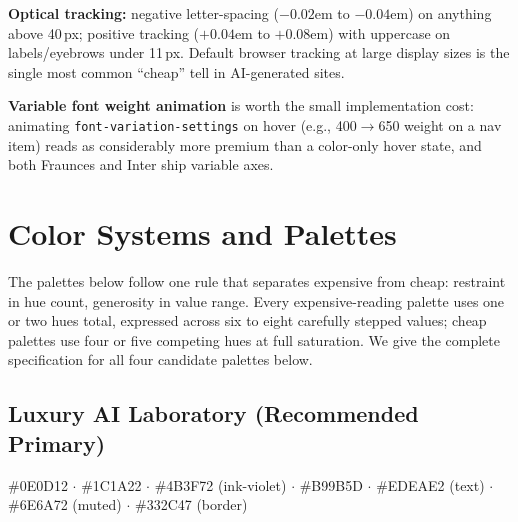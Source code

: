 \documentclass[conference]{IEEEtran}
\begin{document}
\textbf{Optical tracking:} negative letter-spacing ($-0.02$em to $-0.04$em) on anything above 40\,px; positive tracking ($+0.04$em to $+0.08$em) with uppercase on labels/eyebrows under 11\,px. Default browser tracking at large display sizes is the single most common ``cheap'' tell in AI-generated sites.

\textbf{Variable font weight animation} is worth the small implementation cost: animating \texttt{font-variation-settings} on hover (e.g., 400$\to$650 weight on a nav item) reads as considerably more premium than a color-only hover state, and both Fraunces and Inter ship variable axes.

\section{Color Systems and Palettes}

The palettes below follow one rule that separates expensive from cheap: restraint in hue count, generosity in value range. Every expensive-reading palette uses one or two hues total, expressed across six to eight carefully stepped values; cheap palettes use four or five competing hues at full saturation. We give the complete specification for all four candidate palettes below.

\subsection{Luxury AI Laboratory (Recommended Primary)}
\noindent
{}
\par\noindent\footnotesize \#0E0D12 $\cdot$ \#1C1A22 $\cdot$ \#4B3F72 (ink-violet) $\cdot$ \#B99B5D $\cdot$ \#EDEAE2 (text) $\cdot$ \#6E6A72 (muted) $\cdot$ \#332C47 (border)\normalsize
\end{document}
